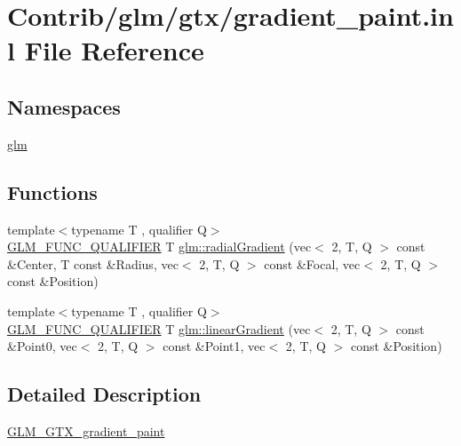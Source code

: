 \hypertarget{gradient__paint_8inl}{}\section{Contrib/glm/gtx/gradient\+\_\+paint.inl File Reference}
\label{gradient__paint_8inl}
\subsection*{Namespaces}
\begin{DoxyCompactItemize}
\item 
 \mbox{\hyperlink{namespaceglm}{glm}}
\end{DoxyCompactItemize}
\subsection*{Functions}
\begin{DoxyCompactItemize}
\item 
{\footnotesize template$<$typename T , qualifier Q$>$ }\\\mbox{\hyperlink{setup_8hpp_a33fdea6f91c5f834105f7415e2a64407}{G\+L\+M\+\_\+\+F\+U\+N\+C\+\_\+\+Q\+U\+A\+L\+I\+F\+I\+ER}} T \mbox{\hyperlink{group__gtx__gradient__paint_gaaecb1e93de4cbe0758b882812d4da294}{glm\+::radial\+Gradient}} (vec$<$ 2, T, Q $>$ const \&Center, T const \&Radius, vec$<$ 2, T, Q $>$ const \&Focal, vec$<$ 2, T, Q $>$ const \&Position)
\item 
{\footnotesize template$<$typename T , qualifier Q$>$ }\\\mbox{\hyperlink{setup_8hpp_a33fdea6f91c5f834105f7415e2a64407}{G\+L\+M\+\_\+\+F\+U\+N\+C\+\_\+\+Q\+U\+A\+L\+I\+F\+I\+ER}} T \mbox{\hyperlink{group__gtx__gradient__paint_ga849241df1e55129b8ce9476200307419}{glm\+::linear\+Gradient}} (vec$<$ 2, T, Q $>$ const \&Point0, vec$<$ 2, T, Q $>$ const \&Point1, vec$<$ 2, T, Q $>$ const \&Position)
\end{DoxyCompactItemize}


\subsection{Detailed Description}
\mbox{\hyperlink{group__gtx__gradient__paint}{G\+L\+M\+\_\+\+G\+T\+X\+\_\+gradient\+\_\+paint}} 